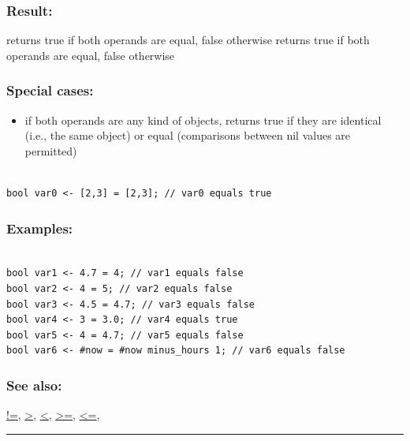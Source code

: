 \documentclass[]{book}
\providecommand{\tightlist}{%
  \setlength{\itemsep}{0pt}\setlength{\parskip}{0pt}}
\theoremstyle{definition}
\theoremstyle{definition}
\theoremstyle{definition}
\theoremstyle{remark}
\begin{document}
\subsubsection{Result:}\label{result-12}

returns true if both operands are equal, false otherwise returns true if
both operands are equal, false otherwise

\subsubsection{Special cases:}\label{special-cases-10}

\begin{itemize}
\tightlist
\item
  if both operands are any kind of objects, returns true if they are
  identical (i.e., the same object) or equal (comparisons between nil
  values are permitted)
\end{itemize}

\begin{verbatim}
 
bool var0 <- [2,3] = [2,3]; // var0 equals true
\end{verbatim}

\subsubsection{Examples:}\label{examples-9}

\begin{verbatim}
 
bool var1 <- 4.7 = 4; // var1 equals false 
bool var2 <- 4 = 5; // var2 equals false 
bool var3 <- 4.5 = 4.7; // var3 equals false 
bool var4 <- 3 = 3.0; // var4 equals true 
bool var5 <- 4 = 4.7; // var5 equals false 
bool var6 <- #now = #now minus_hours 1; // var6 equals false
\end{verbatim}

\subsubsection{See also:}\label{see-also-11}

\href{operators-a-to-a.html\#!=}{!=},
\href{operators-a-to-a.html\#\%3E}{\textgreater{}},
\href{operators-a-to-a.html\#\%3C}{\textless{}},
\href{operators-a-to-a.html\#\%3E=}{\textgreater{}=},
\href{operators-a-to-a.html\#\%3C=}{\textless{}=},

\begin{center}\rule{0.5\linewidth}{\linethickness}\end{center}
\end{document}
